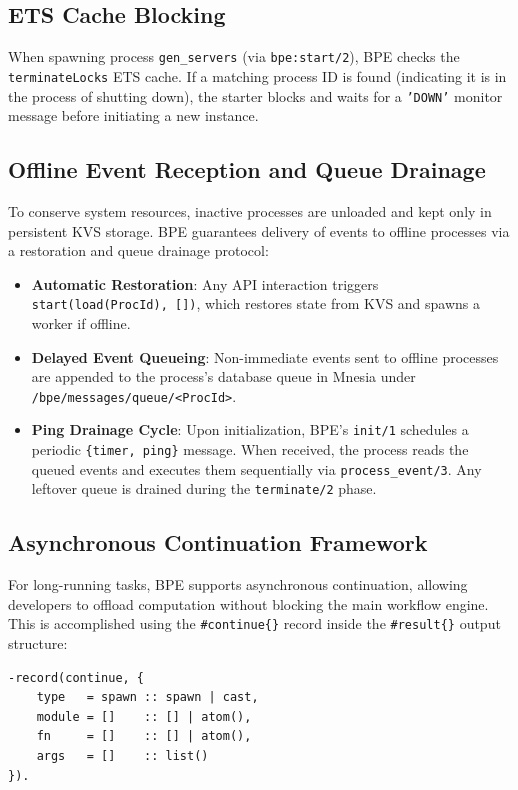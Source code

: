 \documentclass[11pt,a4paper]{article}
\begin{document}
\subsection{ETS Cache Blocking}

When spawning process \texttt{gen\_servers} (via \texttt{bpe:start/2}), BPE checks the \texttt{terminateLocks} ETS cache. If a matching process ID is found (indicating it is in the process of shutting down), the starter blocks and waits for a \texttt{'DOWN'} monitor message before initiating a new instance.

\newpage
\subsection{Offline Event Reception and Queue Drainage}

To conserve system resources, inactive processes are unloaded and kept only in persistent KVS storage. BPE guarantees delivery of events to offline processes via a restoration and queue drainage protocol:
\begin{itemize}
    \item \textbf{Automatic Restoration}: Any API interaction triggers \texttt{start(load(ProcId), [])}, which restores state from KVS and spawns a worker if offline.
    \item \textbf{Delayed Event Queueing}: Non-immediate events sent to offline processes are appended to the process's database queue in Mnesia under \texttt{/bpe/messages/queue/\textless{}ProcId\textgreater{}}.
    \item \textbf{Ping Drainage Cycle}: Upon initialization, BPE's \texttt{init/1} schedules a periodic \texttt{\{timer, ping\}} message. When received, the process reads the queued events and executes them sequentially via \texttt{process\_event/3}. Any leftover queue is drained during the \texttt{terminate/2} phase.
\end{itemize}

\subsection{Asynchronous Continuation Framework}

For long-running tasks, BPE supports asynchronous continuation, allowing developers to offload computation without blocking the main workflow engine. This is accomplished using the \texttt{\#continue\{\}} record inside the \texttt{\#result\{\}} output structure:

\begin{lstlisting}
-record(continue, {
    type   = spawn :: spawn | cast,
    module = []    :: [] | atom(),
    fn     = []    :: [] | atom(),
    args   = []    :: list()
}).
\end{lstlisting}
\end{document}
